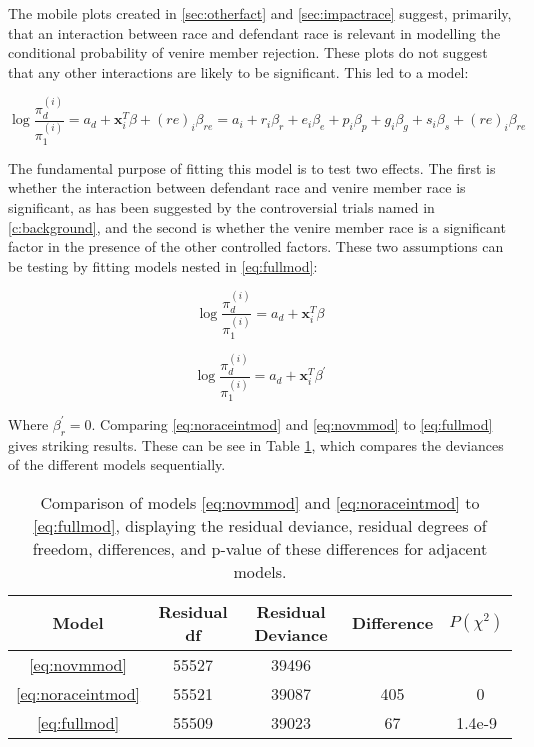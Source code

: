 The mobile plots created in \ref{sec:otherfact} and \ref{sec:impactrace} suggest, primarily, that an interaction between race and
defendant race is relevant in modelling the conditional probability of venire member rejection. These plots do not suggest that
any other interactions are likely to be significant. This led to a model:

\begin{equation}
  \label{eq:fullmod}
  \log \frac{\pi_d^{(i)}}{\pi_1^{(i)}} = a_d + \mathbf{x}_i^T \beta + (re)_i \beta_{re}= a_i + r_i \beta_r + e_i \beta_e + p_i
  \beta_p + g_i \beta_g + s_i \beta_s + (re)_i \beta_{re}
\end{equation}

The fundamental purpose of fitting this model is to test two effects. The first is whether the interaction between defendant race
and venire member race is significant, as has been suggested by the controversial trials named in \ref{c:background}, and the
second is whether the venire member race is a significant factor in the presence of the other controlled factors. These two
assumptions can be testing by fitting models nested in \ref{eq:fullmod}:

\begin{equation}
  \label{eq:noraceintmod}
  \log \frac{\pi_d^{(i)}}{\pi_1^{(i)}} = a_d + \mathbf{x}_i^T \beta
\end{equation}

\begin{equation}
  \label{eq:novmmod}
  \log \frac{\pi_d^{(i)}}{\pi_1^{(i)}} = a_d + \mathbf{x}_i^T \beta^{\prime}
\end{equation}

Where $\beta^{\prime}_r = 0$. Comparing \ref{eq:noraceintmod} and \ref{eq:novmmod} to \ref{eq:fullmod} gives striking
results. These can be see in Table \ref{tab:modcomp}, which compares the deviances of the different models sequentially.

\begin{table}[h!]
  \centering
  \label{tab:modcomp}
  \caption[Model Comparisons to Determine the Importance of
  Race]{\footnotesize Comparison of models \ref{eq:novmmod} and \ref{eq:noraceintmod}
    to \ref{eq:fullmod}, displaying the residual deviance, residual degrees of freedom, differences, and p-value of these
    differences for adjacent models.}
  \begin{tabular}{|c|c|c|c|c|} \hline
    Model & Residual df & Residual Deviance & Difference & $P(\chi^2)$ \\ \hline
    \ref{eq:novmmod} & 55527 & 39496 &  &  \\
    \ref{eq:noraceintmod} & 55521 & 39087 & 405 & ~0 \\
    \ref{eq:fullmod} & 55509 & 39023 & 67 & 1.4e-9 \\ \hline
  \end{tabular}
\end{table}

